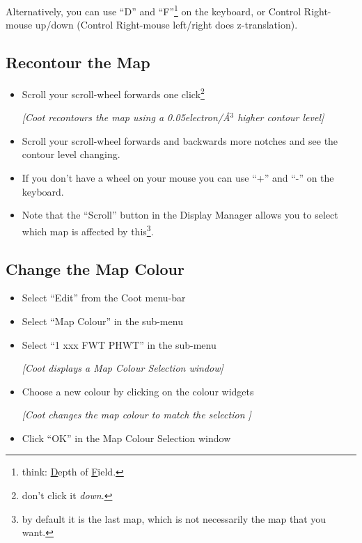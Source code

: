 \documentclass{article}
\begin{document}
Alternatively, you can use ``D'' and ``F''\footnote{think:
  \underline{D}epth of \underline{F}ield.} on the keyboard, or Control
Right-mouse up/down (Control Right-mouse left/right does
z-translation).

\subsection{Recontour the Map}
\begin{itemize}
\item Scroll your scroll-wheel forwards one click\footnote{don't click
    it \emph{down}.}

 \textsl{ [Coot recontours the map using a 0.05electron/\AA$^3$ higher
  contour level]}

\item Scroll your scroll-wheel forwards and backwards more notches and
  see the contour level changing.
  
\item If you don't have a wheel on your mouse you can use ``+'' and
  ``-'' on the keyboard.
  
\item Note that the \textsf{``Scroll''} button in the Display Manager
  allows you to select which map is affected by this\footnote{by
    default it is the last map, which is not necessarily the map that
    you want.}.

\end{itemize}


\subsection{Change the Map Colour}
\begin{itemize}
\item Select \textsf{``Edit''} from the Coot menu-bar
\item Select \textsf{``Map Colour''} in the sub-menu
\item Select \textsf{``1 xxx FWT PHWT''} in the sub-menu

\textsl{ [Coot displays a Map Colour Selection window]}

\item Choose a new colour by clicking on the colour widgets

\textsl{ [Coot changes the map colour to match the selection ]}

\item Click \textsf{``OK''} in the Map Colour Selection window

\end{itemize}
\end{document}
